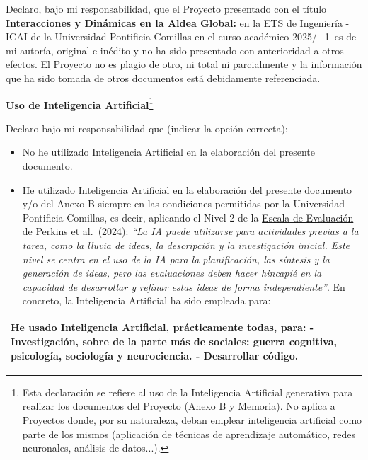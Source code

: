 \documentclass[12pt]{extarticle}
\numberwithin{equation}{section}
\newcommand{\projectTitle}{Interacciones y Dinámicas en la Aldea Global:}
\newcommand{\BeginYear}{2025}
\newcommand{\EndYear}{\number\numexpr\BeginYear+1\relax }
\begin{document}
{\fontsize{11}{15}\selectfont
    Declaro, bajo mi responsabilidad, que el Proyecto presentado con el t\'itulo \textbf{\projectTitle} en la ETS de Ingenier\'ia - ICAI de la Universidad Pontificia Comillas en el curso acad\'emico \BeginYear/\EndYear\ es de mi autor\'ia, original e in\'edito y no ha sido presentado con anterioridad a otros efectos. El Proyecto no es plagio de otro, ni total ni parcialmente y la informaci\'on que ha sido tomada de otros documentos est\'a debidamente referenciada.
    \vspace{5mm}

    \begin{center}
        {\large \textbf{Uso de Inteligencia Artificial}}\footnote{Esta declaraci\'on se refiere al uso de la Inteligencia Artificial generativa para realizar los documentos del Proyecto (Anexo B y Memoria). No aplica a Proyectos donde, por su naturaleza, deban emplear inteligencia artificial como parte de los mismos (aplicaci\'on de t\'ecnicas de aprendizaje autom\'atico, redes neuronales, an\'alisis de datos...).}
    \end{center}

    Declaro bajo mi responsabilidad que (indicar la opci\'on correcta):

    \begin{itemize}
        \item[$\square$] %
        No he utilizado Inteligencia Artificial en la elaboraci\'on del presente documento.
    
        \item[$\boxtimes$] %
        He utilizado Inteligencia Artificial en la elaboraci\'on del presente documento y/o del Anexo B siempre en las condiciones permitidas por la Universidad Pontificia Comillas, es decir, aplicando el Nivel 2 de la \href{https://aiassessmentscale.com/}{Escala de Evaluaci\'on de Perkins et al.\ (2024)}: \emph{``La IA puede utilizarse para actividades previas a la tarea, como la lluvia de ideas, la descripci\'on y la investigaci\'on inicial. Este nivel se centra en el uso de la IA para la planificaci\'on, las s\'intesis y la generaci\'on de ideas, pero las evaluaciones deben hacer hincapi\'e en la capacidad de desarrollar y refinar estas ideas de forma independiente''}. En concreto, la Inteligencia Artificial ha sido empleada para:
    \end{itemize}
    
    \begin{center}
    \renewcommand{\arraystretch}{3}
    \begin{tabular}{|p{\textwidth}|}
    \hline
    {He usado Inteligencia Artificial, prácticamente todas, para:
    - Investigación, sobre de la parte más de sociales: guerra cognitiva, psicología, sociología y neurociencia.
    - Desarrollar código.}
    \vspace{4cm} \\
    \hline
    \end{tabular}
    \end{center}
    
}
\end{document}
